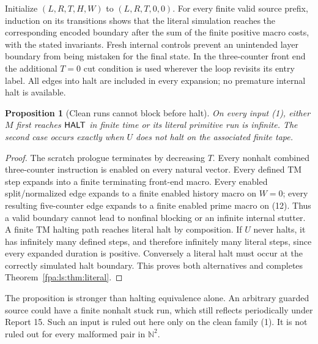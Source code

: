 \documentclass[11pt,a4paper]{article}
\numberwithin{equation}{section}
\newtheorem{proposition}[theorem]{Proposition}
\newcommand{\N}{\mathbb N}\newcommand{\Z}{\mathbb Z}\newcommand{\R}{\mathbb R}
\begin{document}
Initialize $(L,R,T,H,W)$ to $(L,R,T,0,0)$. For every finite valid source
prefix, induction on its transitions shows that the literal simulation
reaches the corresponding encoded boundary after the sum of the finite
positive macro costs, with the stated invariants. Fresh internal controls
prevent an unintended layer boundary from being mistaken for the final
state. In the three-counter front end the additional $T=0$ cut condition is
used wherever the loop revisits its entry label. All edges into halt are
included in every expansion; no premature internal halt is available.

\begin{proposition}[Clean runs cannot block before halt]\label{fpa:ls:prop:continue}
On every input (1), either $M$ first reaches $\mathsf{HALT}$ in finite time or its
literal primitive run is infinite. The second case occurs exactly when $U$
does not halt on the associated finite tape.
\end{proposition}
\begin{proof}
The scratch prologue terminates by decreasing $T$. Every nonhalt combined
three-counter instruction is enabled on every natural vector. Every defined
TM step expands into a finite terminating front-end macro. Every enabled
split/normalized edge expands to a finite enabled history macro on $W=0$;
every resulting five-counter edge expands to a finite enabled prime macro
on (12). Thus a valid boundary cannot lead to nonfinal blocking or an
infinite internal stutter. A finite TM halting path reaches literal halt by
composition. If $U$ never halts, it has infinitely many defined steps, and
therefore infinitely many literal steps, since every expanded duration is
positive. Conversely a literal halt must occur at the correctly simulated
halt boundary. This proves both alternatives and completes
Theorem~\ref{fpa:ls:thm:literal}.
\end{proof}
The proposition is stronger than halting equivalence alone. An arbitrary
guarded source could have a finite nonhalt stuck run, which still reflects
periodically under Report 15. Such an input is ruled out here only on the
clean family (1). It is not ruled out for every malformed pair in $\N^2$.
\end{document}
